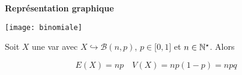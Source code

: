\documentclass[a4paper, 11pt]{article}
\begin{document}
\textbf{Repr\'esentation graphique}

 \begin{center}
 \texttt{[image: binomiale]}
 \end{center}



\begin{prop} Soit $X$ une var avec $X\hookrightarrow \mathcal{B}(n,p)$, $p\in\lbrack 0,1\rbrack$ et $n\in\mathbb{N}^{\star}$. Alors

$$E(X)= np \quad V(X) = np(1-p) =npq$$
\end{prop}
 




%
%
%
%
%
%
%
%
%
%
%
%
%
%
% 
\end{document}
